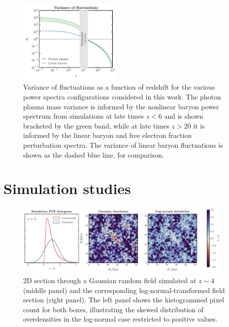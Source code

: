 \documentclass[prd,aps,10pt,nofootinbib,twocolumn,superscriptaddress,preprintnumbers,balancelastpage,longbibliography]{revtex4-1}
\begin{document}
%
\begin{figure}[tbp]
    \centering
    \includegraphics[width=0.45\textwidth]{plots/sigma_all}
    \caption{Variance of fluctuations as a function of redshift for the various power spectra configurations considered in this work. The photon plasma mass variance is informed by the nonlinear baryon power spectrum from simulations at late times $z < 6$ and is shown bracketed by the green band, while at late times $z > 20$ it is informed by the linear baryon and free electron fraction perturbation spectra. The variance of linear baryon fluctuations is shown as the dashed blue line, for comparison.~} 
    \label{fig:sigma_all}
\end{figure}
%

\section{Simulation studies}
\label{sec:simulations}

%
\begin{figure}[htbp]
    \centering
    \includegraphics[width=0.95\textwidth]{plots/hist_LN_sims}
    \caption{2D section through a Gaussian random field simulated at $z\sim 4$ (middle panel) and the corresponding log-normal-transformed field section (right panel). The left panel shows the histogrammed pixel count for both boxes, illustrating the skewed distribution of overdensities in the log-normal case restricted to positive values.~} 
    \label{fig:ln_sims}
\end{figure}
%
\end{document}
